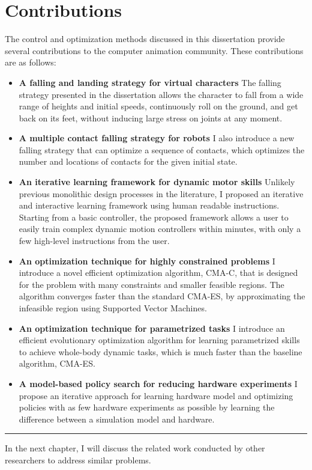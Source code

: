 \section{Contributions}
The control and optimization methods discussed in this dissertation provide
several contributions to the computer animation community. 
These contributions are as follows:


\begin{itemize}
\item \textbf{A falling and landing strategy for virtual characters}
  The falling strategy presented in the dissertation allows the character to
  fall from a wide range of heights and initial speeds, continuously roll 
  on the ground, and get back on its feet, without inducing large stress on
  joints at any moment.
\item \textbf{A multiple contact falling strategy for robots}
  I also introduce a new falling strategy that can optimize a sequence
  of contacts, which optimizes the number and locations of contacts
  for the given initial state.
\item \textbf{An iterative learning framework for dynamic motor skills}
  Unlikely previous monolithic design processes in the literature,
  I proposed an iterative and interactive learning framework 
  using human readable instructions.
  Starting from a basic controller, the proposed framework allows a user 
  to easily train complex dynamic motion controllers within minutes,
  with only a few high-level instructions from the user.
\item \textbf{An optimization technique for highly constrained problems}
  I introduce a novel efficient optimization algorithm, CMA-C, that is 
  designed for the problem with many constraints and smaller feasible regions.
  The algorithm converges faster than the standard CMA-ES,
  by approximating the infeasible region using
  Supported Vector Machines.
\item \textbf{An optimization technique for parametrized tasks}
  I introduce an efficient evolutionary optimization algorithm for learning
  parametrized skills to achieve whole-body dynamic tasks, which is much
  faster than the baseline algorithm, CMA-ES.
\item \textbf{A model-based policy search for reducing hardware experiments}
  I propose an iterative approach for learning hardware model and optimizing
  policies with as few hardware experiments as possible by learning the
  difference between a simulation model and hardware.
\end{itemize}

\rule{0.95\textwidth}{1pt}

In the next chapter, I will discuss the related work conducted by other
researchers to address similar problems.
